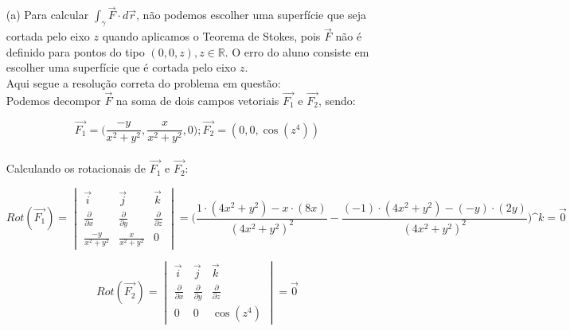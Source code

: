 \documentclass[12pt,a4paper]{article}
\begin{document}
\begin{itemize}
	\item[(a)]Para calcular $ \displaystyle \int_{\gamma} \vec{F} \cdot d\vec{r} $, não podemos escolher uma superfície que seja cortada pelo eixo $z$ quando aplicamos o Teorema de Stokes, pois $\vec{F}$ não é definido para pontos do tipo $(0,0,z), z \in \mathbb{R} $. O erro do aluno consiste em escolher uma superfície que é cortada pelo eixo $z$. \\
	
	
Aqui segue a resolução correta do problema em questão: \\



Podemos decompor $\vec{F}$ na soma de dois campos vetoriais $\vec{F_1}$ e $\vec{F_2}$, sendo:

\[ \vec{F_1} =  \Big( \frac{-y}{x^2 + y^2}, \frac{x}{x^2 + y^2}, 0 \Big) ; \vec{F_2} = ( 0, 0, \cos(z^4) ) \] \\

Calculando os rotacionais de $\vec{F_1}$ e $\vec{F_2}$:

\[ \displaystyle Rot(\vec{F_1}) =  \begin{vmatrix} \vec{i} & \vec{j} & \vec{k} \\ \frac{\partial}{\partial x} & \frac{\partial}{\partial y} & \frac{\partial}{\partial z}  \\ \frac{-y}{x^2 + y^2}  & \frac{x}{x^2 + y^2} & 0  \end{vmatrix} = \Big( \frac{1 \cdot (4x^2 + y^2) - x \cdot (8x)}{(4x^2 + y^2)^2} - \frac{(-1) \cdot (4x^2 + y^2) - (-y) \cdot (2y)}{(4x^2 + y^2)^2} \Big) \^{k} = \vec{0} \] 

\[ Rot(\vec{F_2}) = \begin{vmatrix} \vec{i} & \vec{j} & \vec{k} \\ \frac{\partial}{\partial x} & \frac{\partial}{\partial y} & \frac{\partial}{\partial z}  \\  0 & 0 & \cos(z^4)  \end{vmatrix} = \vec{0} \] \\


\end{itemize}
\end{document}
